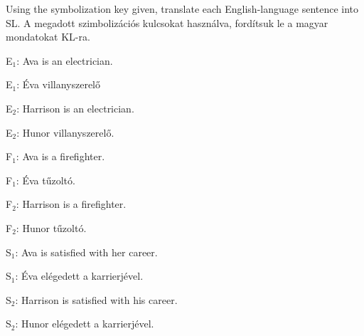 \solutions
\problempart Using the symbolization key given, translate each English-language sentence into SL.
\problempart A megadott szimbolizációs kulcsokat használva, fordítsuk le a magyar mondatokat KL-ra.
\label{pr.avacareer}
\begin{ekey}
\item[E$_1$:] Ava is an electrician.
\item[E$_1$:] Éva villanyszerelő
\item[E$_2$:] Harrison is an electrician.
\item[E$_2$:] Hunor villanyszerelő.
\item[F$_1$:] Ava is a firefighter.
\item[F$_1$:] Éva tűzoltó.
\item[F$_2$:] Harrison is a firefighter.
\item[F$_2$:] Hunor tűzoltó.
\item[S$_1$:] Ava is satisfied with her career.
\item[S$_1$:] Éva elégedett a karrierjével.
\item[S$_2$:] Harrison is satisfied with his career.
\item[S$_2$:] Hunor elégedett a karrierjével.

\end{ekey}
